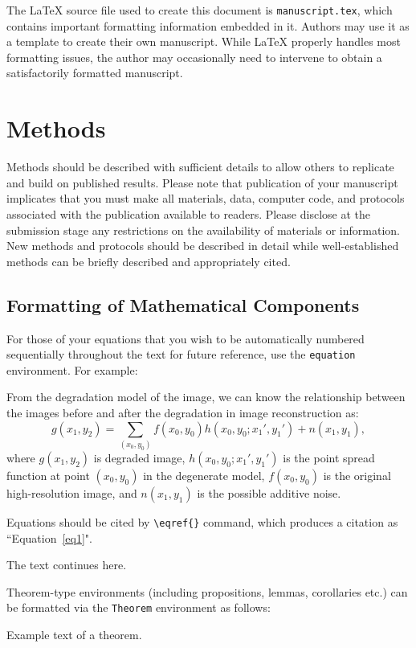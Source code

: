 \documentclass[12pt]{gsis}  %
\begin{document}
The LaTeX source file used to create this document is \texttt{manuscript.tex}, which contains important formatting information embedded in it. Authors may use it as a template to create their own manuscript. While LaTeX properly handles most formatting issues, the author may occasionally need to intervene to obtain a satisfactorily  formatted manuscript.

\section{Methods}
Methods should be described with sufficient details to allow others to replicate and build on published results. Please note that publication of your manuscript implicates that you must make all materials, data, computer code, and protocols associated with the publication available to readers. Please disclose at the submission stage any restrictions on the availability of materials or information. New methods and protocols should be described in detail while well-established methods can be briefly described and appropriately cited.

\subsection{Formatting of Mathematical Components}
For those of your equations that you wish to be automatically numbered sequentially throughout the text for future reference, use the \texttt{equation} environment. For example:

From the degradation model of the image, we can know the relationship between the images before and after the degradation in image reconstruction as:
\begin{equation}
g(x_1,y_2)=\sum_{(x_0,y_0)}f(x_0,y_0)h(x_0,y_0;x_1',y_1')+n(x_1,y_1) ,
\label{eq1}
\end{equation}
where $g(x_1,y_2)$ is degraded image, $h(x_0,y_0;x_1',y_1')$ is the point spread function at point $(x_0,y_0)$   in the degenerate model,  $f(x_0,y_0)$ is the original high-resolution image, and  $n(x_1,y_1)$ is the possible additive noise. 

Equations should be cited by \verb"\eqref{}" command, which produces a citation as ``Equation~\eqref{eq1}".

The text continues here.

Theorem-type environments (including propositions, lemmas, corollaries etc.) can be formatted via the \texttt{Theorem} environment as follows:
\begin{Theorem}
Example text of a theorem.
\end{Theorem}
\end{document}
